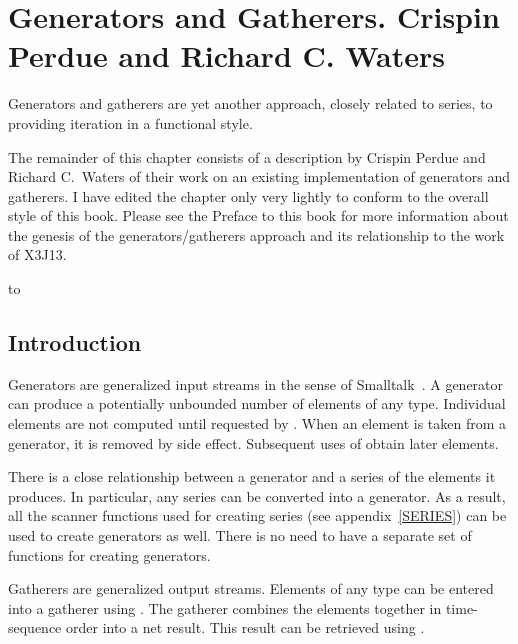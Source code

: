 

\clearpage\def\pagestatus{FINAL PROOF}

\chapter{Generators and Gatherers. Crispin Perdue and Richard C. Waters}
\label{GENERATORS}

\begin{new}
\prefaceword  Generators and gatherers are yet another
approach, closely related to series,
to providing iteration in a functional style.

The remainder of this chapter consists of a description by Crispin Perdue
and Richard C.~Waters of their work on an existing implementation of
generators and gatherers.  I have edited the chapter only very lightly to
conform to the overall style of this book.  Please see the Preface to this
book for more information about the genesis of the generators/gatherers
approach and its relationship to the work of X3J13.

\noindent\hbox to \textwidth{\hss---Guy L. Steele Jr.}

\section{Introduction}

Generators are generalized input streams in the sense of
Smalltalk~\cite{SMALLTALK-80-BOOK}.  A generator can produce a potentially
unbounded number of elements of any type.  Individual elements are not
computed until requested by .  When an element is taken from
a generator, it is removed by side effect.  Subsequent uses of 
 obtain later elements.

There is a close relationship between a generator and a series of the
elements it produces.  In particular, any series can be converted into
a generator.  As a result, all the scanner functions used for
creating series (see appendix~\ref{SERIES}) can be used to create
generators as well.  There is no need to have a separate
set of functions for creating generators.

Gatherers are generalized output streams.  Elements of any type can be
entered into a gatherer using .  The gatherer combines the
elements together in time-sequence order into a net result.  This result can
be retrieved using .


\end{new}
